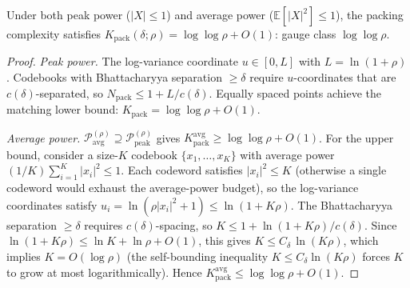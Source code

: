 \documentclass[10pt,a4paper]{amsart}
\newcommand{\E}{\mathbb{E}}
\newcommand{\setP}{\mathcal{P}}
\newcommand{\snr}{\rho}
\begin{document}
\begin{lemma}
\label{lem:constraint}
Under both peak power ($|X| \le 1$) and average power
($\E[|X|^2] \le 1$), the packing complexity satisfies
$K_{\mathrm{pack}}(\delta;\snr) = \log\log\snr + O(1)$: gauge
class $\log\log\snr$.
\end{lemma}

\begin{proof}
\emph{Peak power.}
The log-variance coordinate $u\in[0,L]$ with $L=\ln(1+\snr)$.
Codebooks with Bhattacharyya separation $\ge\delta$ require
$u$-coordinates that are $c(\delta)$-separated, so
$N_{\mathrm{pack}} \le 1+L/c(\delta)$. Equally spaced points
achieve the matching lower bound:
$K_{\mathrm{pack}} = \log\log\snr + O(1)$.

\emph{Average power.}
$\setP^{(\snr)}_{\mathrm{avg}} \supseteq
\setP^{(\snr)}_{\mathrm{peak}}$ gives
$K_{\mathrm{pack}}^{\mathrm{avg}} \ge \log\log\snr + O(1)$.
For the upper bound, consider a size-$K$ codebook
$\{x_1,\dots,x_K\}$ with average power
$(1/K)\sum_{i=1}^{K}|x_i|^2 \le 1$. Each codeword satisfies
$|x_i|^2 \le K$ (otherwise a single codeword would exhaust the
average-power budget), so the log-variance coordinates satisfy
$u_i = \ln(\snr|x_i|^2+1) \le \ln(1+K\snr)$.
The Bhattacharyya separation $\ge\delta$ requires
$c(\delta)$-spacing, so
$K \le 1 + \ln(1+K\snr)/c(\delta)$.
Since $\ln(1+K\snr) \le \ln K + \ln\snr + O(1)$, this gives
$K \le C_\delta\,\ln(K\snr)$, which implies
$K = O(\log\snr)$ (the self-bounding inequality
$K \le C_\delta\ln(K\snr)$ forces $K$ to grow at most
logarithmically). Hence
$K_{\mathrm{pack}}^{\mathrm{avg}} \le \log\log\snr + O(1)$.
\end{proof}
\end{document}
